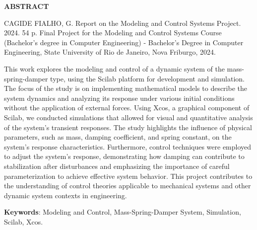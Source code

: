 \begin{titlepage}
    \thispagestyle{empty} %

    \begin{center}
        \textbf{\Large ABSTRACT}
    \end{center}

    \vspace{1cm} %

    \noindent CAGIDE FIALHO, G. Report on the Modeling and Control Systems Project. 2024. 54 p. Final Project for the Modeling and Control Systems Course (Bachelor’s degree in Computer Engineering) - Bachelor’s Degree in Computer Engineering, State University of Rio de Janeiro, Nova Friburgo, 2024.

    \vspace{0.4cm} %

    This work explores the modeling and control of a dynamic system of the mass-spring-damper type, using the Scilab platform for development and simulation. The focus of the study is on implementing mathematical models to describe the system dynamics and analyzing its response under various initial conditions without the application of external forces. Using Xcos, a graphical component of Scilab, we conducted simulations that allowed for visual and quantitative analysis of the system's transient responses. The study highlights the influence of physical parameters, such as mass, damping coefficient, and spring constant, on the system's response characteristics. Furthermore, control techniques were employed to adjust the system's response, demonstrating how damping can contribute to stabilization after disturbances and emphasizing the importance of careful parameterization to achieve effective system behavior. This project contributes to the understanding of control theories applicable to mechanical systems and other dynamic system contexts in engineering.
    \vspace{0.4cm} %

    \textbf{Keywords}: Modeling and Control, Mass-Spring-Damper System, Simulation, Scilab, Xcos.
\end{titlepage}
